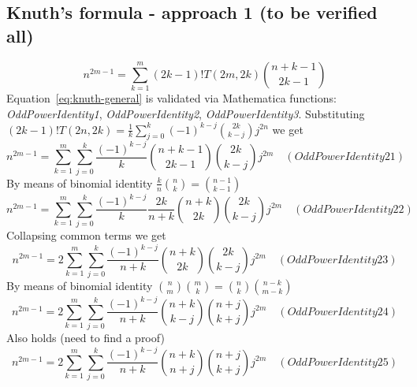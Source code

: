 \subsection{Knuth's formula - approach 1 (to be verified all)}\label{subsec:knuth's-formula---approach-1-(to-be-verified-all)}
\begin{equation}
    n^{2m-1} = \sum_{k=1}^{m} (2k-1)! T(2m,2k) \binom{n+k-1}{2k-1}\label{eq:knuth-general}
\end{equation}
Equation~\eqref{eq:knuth-general} is validated via Mathematica functions:
    \textit{OddPowerIdentity1}, \textit{OddPowerIdentity2}, \textit{OddPowerIdentity3}.
Substituting $(2k-1)! T(2n,2k) = \frac{1}{k} \sum_{j=0}^{k} (-1)^{k-j} \binom{2k}{k-j} j^{2n}$ we get
\begin{equation*}
    n^{2m-1} = \sum_{k=1}^{m} \sum_{j=0}^{k} \frac{(-1)^{k-j}}{k} \binom{n+k-1}{2k-1} \binom{2k}{k-j} j^{2m} \quad
    (OddPowerIdentity21)
\end{equation*}
By means of binomial identity $\frac{k}{n} \binom{n}{k} = \binom{n-1}{k-1}$
\begin{equation*}
    n^{2m-1} = \sum_{k=1}^{m} \sum_{j=0}^{k} \frac{(-1)^{k-j}}{k} \frac{2k}{n+k} \binom{n+k}{2k} \binom{2k}{k-j} j^{2m} \quad
    (OddPowerIdentity22)
\end{equation*}
Collapsing common terms we get
\begin{equation*}
    n^{2m-1} = 2\sum_{k=1}^{m} \sum_{j=0}^{k} \frac{(-1)^{k-j}}{n+k} \binom{n+k}{2k} \binom{2k}{k-j} j^{2m} \quad
    (OddPowerIdentity23)
\end{equation*}
By means of binomial identity $\binom{n}{m} \binom{m}{k} = \binom{n}{k} \binom{n-k}{m-k}$
\begin{equation*}
    n^{2m-1} = 2\sum_{k=1}^{m} \sum_{j=0}^{k} \frac{(-1)^{k-j}}{n+k} \binom{n+k}{k-j} \binom{n+j}{k+j} j^{2m} \quad
    (OddPowerIdentity24)
\end{equation*}
Also holds (need to find a proof)
\begin{equation*}
    n^{2m-1} = 2\sum_{k=1}^{m} \sum_{j=0}^{k} \frac{(-1)^{k-j}}{n+k} \binom{n+k}{n+j} \binom{n+j}{k+j} j^{2m} \quad
    (OddPowerIdentity25)
\end{equation*}

